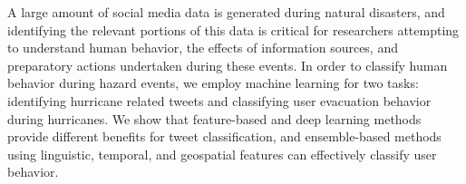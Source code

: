 A large amount of social media data is generated during natural disasters, and identifying the relevant portions of this data is critical for researchers attempting to understand human behavior, the effects of information sources, and preparatory actions undertaken during these events. In order to classify human behavior during hazard events, we employ machine learning for two tasks: identifying hurricane related tweets and classifying user evacuation behavior during hurricanes. We show that feature-based and deep learning methods provide different benefits for tweet classification, and ensemble-based methods using linguistic, temporal, and geospatial features can effectively classify user behavior.
